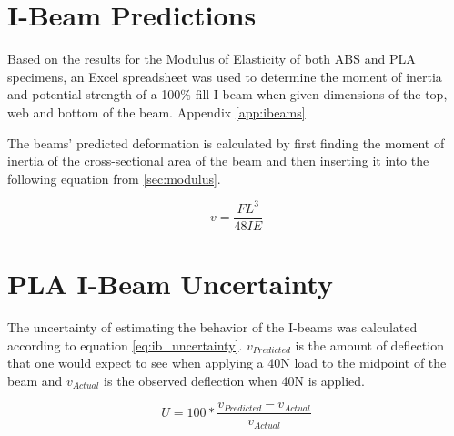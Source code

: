\section{I-Beam Predictions}
Based on the results for the Modulus of Elasticity of both ABS and PLA specimens, an Excel spreadsheet was used to determine the moment of inertia and potential strength of a 100\% fill I-beam when given dimensions of the top, web and bottom of the beam. Appendix \ref{app:ibeams}\par
	The beams' predicted deformation is calculated by first finding the moment of inertia of the cross-sectional area of the beam and then inserting it into the following equation from \ref{sec:modulus}. 

\begin{equation}
v = \frac{FL^3}{48IE}
\end{equation}

\section{PLA I-Beam Uncertainty}
The uncertainty of estimating the behavior of the I-beams was calculated according to equation \ref{eq:ib_uncertainty}. $v_{Predicted}$ is the amount of deflection that one would expect to see when applying a 40N load to the midpoint of the beam and $v_{Actual}$ is the observed deflection when 40N is applied.

\begin{equation}\label{eq:ib_uncertainty}
U = 100*\frac{v_{Predicted}-v_{Actual}}{v_{Actual}}
\end{equation}